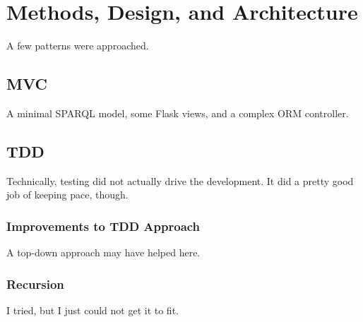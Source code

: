 \chapter{Methods, Design, and Architecture}

A few patterns were approached.

 
\section{MVC}

A minimal SPARQL model, some Flask views, and a complex ORM controller.


\section{TDD}

Technically, testing did not actually drive the development. It did a pretty good job of keeping pace, though.


\subsection{Improvements to TDD Approach}

A top-down approach may have helped here.


\subsection{Recursion}

I tried, but I just could not get it to fit.
